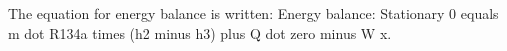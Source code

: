 The equation for energy balance is written:  
Energy balance:  
Stationary  
0 equals m dot R134a times (h2 minus h3) plus Q dot zero minus W x.